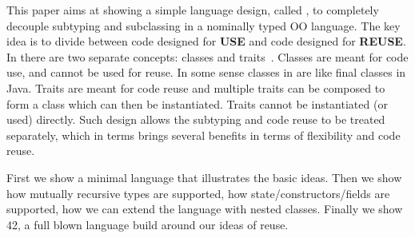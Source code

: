 \begin{comment}
An iconic example on why connecting inheritance/code reuse and
subtpying is problematic is provided by the
historic\cite{LaLonde:1991:SSS:110673.110679}: A reasonable
implementation for a \Q@Set@ may be easy to extend into a \Q@Bag@
keeping tracks of how many times an element occurs.  We would just add
some state and override a couple of methods.\bruno{Are we going to
  present this example in the paper solved in 42, for example? 
I think I would expect to see it.}

However, our subclassing would break Liskov substitution principle (LSP)~\cite{martin2000design}: not all bags are sets!
Of course, one could retroactivelly fix this problem by introducing \Q@AbstractSetOrBag@
and making both \Q@Bag@ and \Q@Set@ inherit from it.
This looks unnatural, since \Q@Set@ would extend it without adding anything,
and we would be surprised to find a use of the type \Q@AbstractSetOrBag@.
Worst, if we was to constantly apply this mentalty, we would introduce a very high number
of abstract classes that are not supposed to be used as types, and that will clutter the 
public interface of our classes and our code project as a whole.
\end{comment}

This paper aims at showing a simple language design, called \name, to
completely decouple subtyping and subclassing in a nominally typed OO
language. The key idea is to divide between code designed for
\textbf{USE} and code designed for \textbf{REUSE}. 
In \name there are two separate concepts: classes
and traits~\cite{}. Classes are meant for code use, and cannot be used
for reuse. In some sense classes in \name are like final classes in
Java. Traits are meant for code reuse and multiple traits can be
composed to form a class which can then be instantiated. Traits 
cannot be instantiated (or used) directly. Such design allows the
subtyping and code reuse to be treated separately, which in terms 
brings several benefits in terms of flexibility and code reuse.

First we show a minimal language that illustrates the basic ideas. 
Then we show how mutually recursive types
are supported, how state/constructors/fields are supported,
how we can extend the language with nested classes.
Finally we show 42, a full blown language build around our ideas of
reuse.

